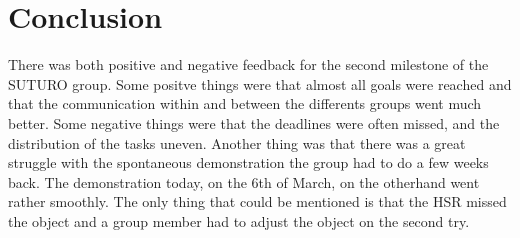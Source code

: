 \documentclass[main.tex]{subfiles}
\begin{document}
	
	\chapter{Conclusion}
	
	There was both positive and negative feedback for the second milestone of the SUTURO group. Some positve things were that almost all goals were reached and that the communication within and between the differents groups went much better. Some negative things were that  the deadlines were often missed, and the distribution of the tasks uneven. Another thing was that there was a great struggle with the spontaneous demonstration the group had to do a few weeks back. 
The demonstration today, on the 6th of March, on the otherhand went rather smoothly. The only thing that could be mentioned is that the HSR missed the object and a group member had to adjust the object on the second try.  
	
\end{document}
